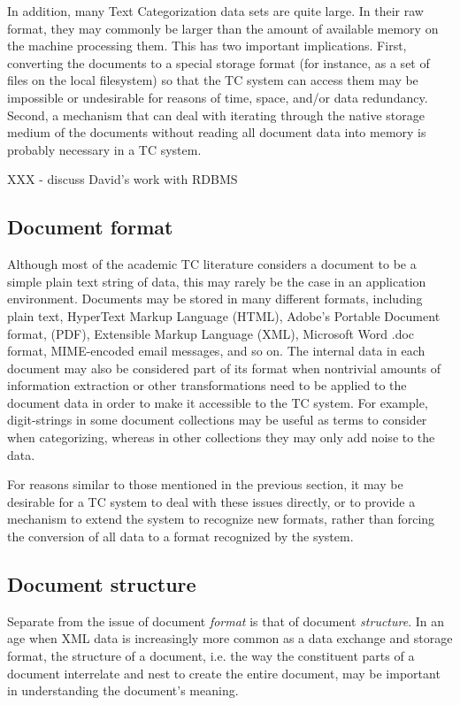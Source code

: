 In addition, many Text Categorization data sets are quite large.  In
their raw format, they may commonly be larger than the amount of
available memory on the machine processing them.  This has two
important implications.  First, converting the documents to a special
storage format (for instance, as a set of files on the local
filesystem) so that the TC system can access them may be impossible or
undesirable for reasons of time, space, and/or data redundancy.
Second, a mechanism that can deal with iterating through the native
storage medium of the documents without reading all document data into
memory is probably necessary in a TC system.

XXX - discuss David's work with RDBMS

\subsection{Document format}
\label{Document format}

Although most of the academic TC literature considers a document to be
a simple plain text string of data, this may rarely be the case in an
application environment.  Documents may be stored in many different
formats, including plain text, HyperText Markup Language (HTML),
Adobe's Portable Document format, (PDF), Extensible Markup Language
(XML), Microsoft Word .doc
format, MIME-encoded email messages, and so on.  The internal data in
each document may also be considered part of its format when
nontrivial amounts of information extraction or other transformations
need to be applied to the document data in order to make it accessible
to the TC system.  For example, digit-strings in some document
collections may be useful as terms to consider when categorizing,
whereas in other collections they may only add noise to the data.

For reasons similar to those mentioned in the previous section, it may
be desirable for a TC system to deal with these issues directly, or
to provide a mechanism to extend the system to recognize new formats,
rather than forcing the conversion of all data to
a format recognized by the system.

\subsection{Document structure}

Separate from the issue of document \emph{format} is that of document
\emph{structure}.  In an age when XML data is increasingly more common
as a data exchange and storage format, the structure of a document,
i.e. the way the constituent parts of a document interrelate and nest
to create the entire document, may be important in understanding the
document's meaning.

